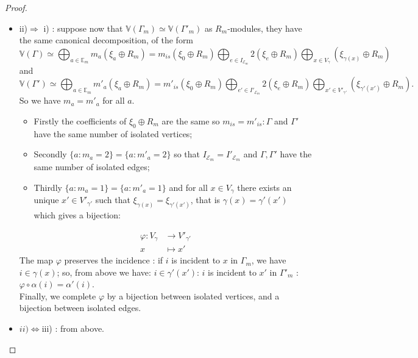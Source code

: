 \documentclass[preprint,12pt,authoryear]{elsarticle}
\theoremstyle{definition}
\begin{document}
\begin{proof}
\begin{itemize}
\item[-] ii)$\Longrightarrow$ i) : suppose now that  $\mathbb{V}(\Gamma_m) \simeq \mathbb{V}(\Gamma'_m)$ as $R_m$-modules, they have the same canonical decomposition, of the form 
$$\mathbb{V}(\Gamma)\simeq \bigoplus_{a \in \mathbb{E}_m}m_a (\xi_a\oplus R_m)=
 m_{is} \left(\xi_{0}\oplus R_m\right)\bigoplus_{e\in I_{\mathcal{E}_m}} 2 \left(\xi_{e}\oplus R_m\right) \bigoplus_{x \in V_{\gamma}} \left(\xi_{\gamma(x)}\oplus R_m\right)$$
and
$$\mathbb{V}(\Gamma')\simeq \bigoplus_{a \in \mathbb{E}_m}m'_a (\xi_a\oplus R_m)=
 m'_{is} \left(\xi_{0}\oplus R_m\right)\bigoplus_{e'\in I'_{\mathcal{E}_m}} 2 \left(\xi_{e}\oplus R_m\right) \bigoplus_{x' \in V'_{\gamma'}} \left(\xi_{\gamma'(x')}\oplus R_m\right).$$
So we have $m_a=m'_a$ for all $a$.
\begin{itemize}
\item[-] Firstly the coefficients of $\xi_0 \oplus R_m$ are the same so $m_{is}=m'_{is}: \Gamma$ and $\Gamma'$ have the same number of isolated vertices;
\item[-] Secondly $\{a: m_a=2\}=\{ a: m'_a=2\}$ so that $ I_{\mathcal{E}_m}= I'_{\mathcal{E}_m}$ and  $\Gamma, \Gamma'$ have the same number of isolated edges;
\item[-] Thirdly $\{a: m_a=1\}=\{ a: m'_a=1\}$ and for all  $x \in V_{\gamma}$ there exists an  unique $x' \in
 V'_{\gamma'}$ such that $\xi_{\gamma(x)}=\xi_{\gamma'(x')}$, that is $\gamma(x)
 =\gamma'(x')$ which   gives a bijection: 
\end{itemize}
 \begin{eqnarray*} 
 \varphi  : V_{\gamma}& \longrightarrow V'_{\gamma'}\\
                               x    & \longmapsto x'
\end{eqnarray*}
The map $\varphi$ preserves the  incidence : if $i$ is  incident to $x$ in $\Gamma_m$, we have $i \in
\gamma(x)$; so, from above  we have: $i \in \gamma'(x')$: $i$ is incident to $x'$ in $\Gamma'_m$ : $\varphi\circ\alpha(i)=\alpha'(i)$.\\

\noindent Finally, we complete $\varphi$ by a bijection between isolated vertices, and a bijection between isolated edges.
\item[-] $ii)\Longleftrightarrow $iii) : from above. \qedhere
\end{itemize}
\end{proof}


\end{document}
